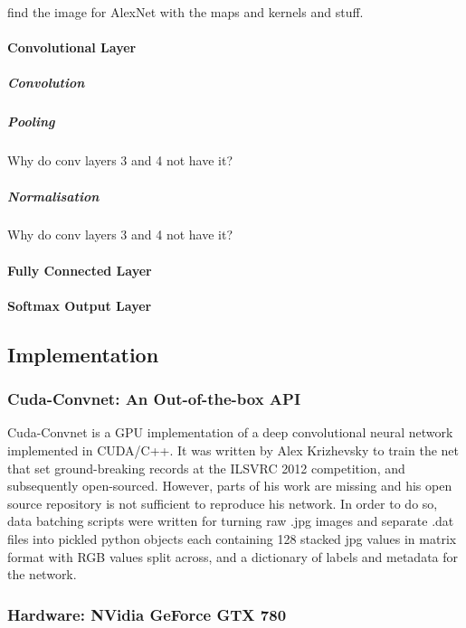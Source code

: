 \documentclass[a4paper,11pt]{article}
\begin{document}
find the image for AlexNet with the maps and kernels and stuff.

\paragraph{Convolutional Layer}

\subparagraph{Convolution}

\subparagraph{Pooling}

Why do conv layers 3 and 4 not have it? \\

\subparagraph{Normalisation}

Why do conv layers 3 and 4 not have it? \\

\paragraph{Fully Connected Layer}

\paragraph{Softmax Output Layer}


\subsection{Implementation}

\subsubsection{Cuda-Convnet: An Out-of-the-box API}

Cuda-Convnet is a GPU implementation of a deep convolutional neural network implemented in CUDA/C++. It was written by Alex Krizhevsky to train the net that set ground-breaking records at the ILSVRC 2012 competition, and subsequently open-sourced. However, parts of his work are missing and his open source repository is not sufficient to reproduce his network. In order to do so, data batching scripts were written for turning raw .jpg images and separate .dat files into pickled python objects each containing 128 stacked jpg values in matrix format with RGB values split across, and a dictionary of labels and metadata for the network. \\

\subsubsection{Hardware: NVidia GeForce GTX 780}
\end{document}
